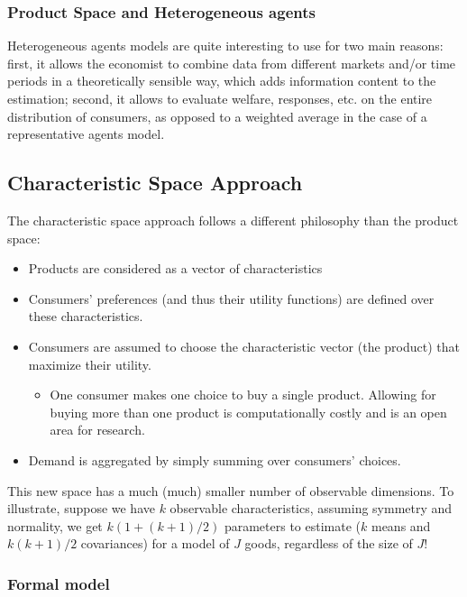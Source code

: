 \subsubsection{Product Space and Heterogeneous agents}

Heterogeneous agents models are quite interesting to use for two main reasons: first, it allows the economist to combine data from different markets and/or time periods in a theoretically sensible way, which adds information content to the estimation; second, it allows to evaluate welfare, responses, etc. on the entire distribution of consumers, as opposed to a weighted average in the case of a representative agents model.

\subsection{Characteristic Space Approach}

The characteristic space approach follows a different philosophy than the product space:\begin{itemize}
\item Products are considered as a vector of characteristics
\item Consumers' preferences (and thus their utility functions) are defined over these characteristics.
\item Consumers are assumed to choose the characteristic vector (the product) that maximize their utility.
\begin{itemize}
\item One consumer makes one choice to buy a single product. Allowing for buying more than one product is computationally costly and is an open area for research.
\end{itemize}
\item Demand is aggregated by simply summing over consumers' choices.
\end{itemize}

This new space has a much (much) smaller number of observable dimensions. To illustrate, suppose we have $k$ observable characteristics, assuming symmetry and normality, we get $k(1 + (k+1)/2)$ parameters to estimate ($k$ means and $k(k+1)/2$ covariances) for a model of $J$ goods, regardless of the size of $J$!

\subsubsection{Formal model}

